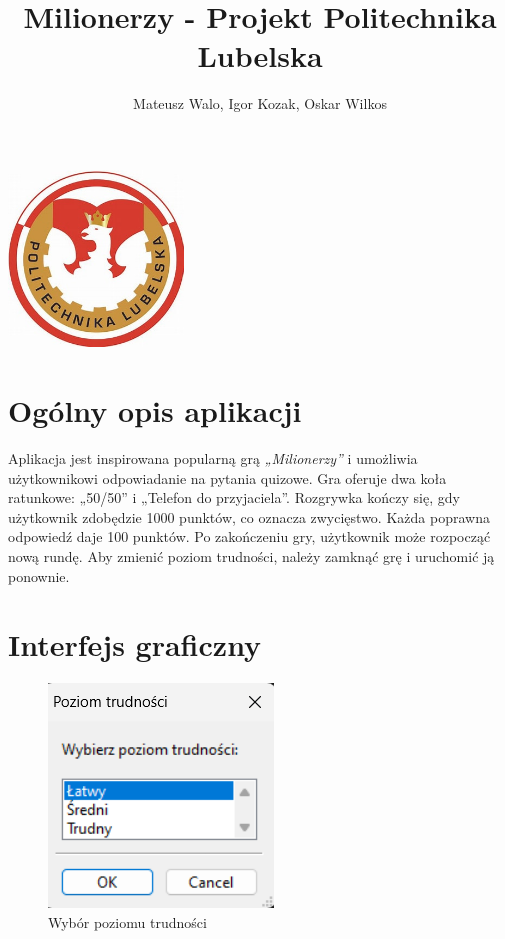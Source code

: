 \documentclass[]{article}
\title{Milionerzy - Projekt Politechnika Lubelska}
\author{Mateusz Walo, Igor Kozak, Oskar Wilkos}
\date{}
\begin{document}
	
	\maketitle
	
	\begin{center}
		\includegraphics[width=0.35\textwidth]{pl.jpg} 
	\end{center}
	
	\tableofcontents
	\newpage
	
	\fancyhf{} %
	\pagestyle{fancy}
	\renewcommand{\cftsecfont}{\bfseries} %
	\setlength{\cftsecnumwidth}{2.5em} %
	
	\section{Ogólny opis aplikacji}
	Aplikacja jest inspirowana popularną grą \emph{„Milionerzy”} i umożliwia użytkownikowi odpowiadanie na pytania quizowe. Gra oferuje dwa koła ratunkowe: „50/50” i „Telefon do przyjaciela”. Rozgrywka kończy się, gdy użytkownik zdobędzie 1000 punktów, co oznacza zwycięstwo. Każda poprawna odpowiedź daje 100 punktów. Po zakończeniu gry, użytkownik może rozpocząć nową rundę. Aby zmienić poziom trudności, należy zamknąć grę i uruchomić ją ponownie.
	
	\newpage
	
\section{Interfejs graficzny}
	
\begin{figure}[H]
	\centering
	\includegraphics[]{1.png}
	\caption{Wybór poziomu trudności}
	\label{rys:1}
\end{figure}
	
\end{document}
